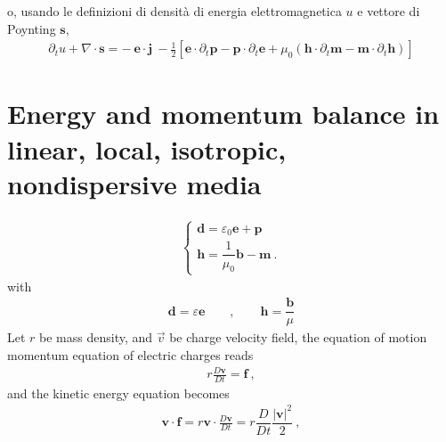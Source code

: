 \documentclass[letterpaper,10pt,italian]{jupyterBook}
\begin{document}
\sphinxAtStartPar
o, usando le definizioni di densità di energia elettromagnetica \(u\) e vettore di Poynting \(\mathbf{s}\),
\begin{equation*}
\begin{split}
  \partial_t u + \nabla \cdot \mathbf{s} =
    - \ \mathbf{e} \cdot \mathbf{j} \
    - \frac{1}{2} \left[ \mathbf{e} \cdot \partial_t \mathbf{p} - \mathbf{p} \cdot \partial_t \mathbf{e} + \mu_0 \left(  \mathbf{h} \cdot \partial_t \mathbf{m} - \mathbf{m} \cdot \partial_t \mathbf{h} \right) \right]
\end{split}
\end{equation*}
\sphinxstepscope


\chapter{Energy and momentum balance in linear, local, isotropic, non\sphinxhyphen{}dispersive media}
\label{\detokenize{ch/energy-linear:energy-and-momentum-balance-in-linear-local-isotropic-non-dispersive-media}}\label{\detokenize{ch/energy-linear:classical-electromagnetism-energy}}\label{\detokenize{ch/energy-linear::doc}}\begin{equation*}
\begin{split}\begin{cases}
  \mathbf{d} = \varepsilon_0 \mathbf{e} + \mathbf{p} \\
  \mathbf{h} = \dfrac{1}{\mu_0} \mathbf{b} - \mathbf{m} \ .
\end{cases}\end{split}
\end{equation*}
\sphinxAtStartPar
with
\begin{equation*}
\begin{split}\mathbf{d} = \varepsilon \mathbf{e} \qquad , \qquad \mathbf{h} = \dfrac{\mathbf{b}}{\mu}\end{split}
\end{equation*}
\sphinxAtStartPar
Let \(r\) be mass density, and \(\vec{v}\) be charge velocity field, the equation of motion \sphinxhyphen{} momentum equation \sphinxhyphen{} of electric charges reads
\begin{equation*}
\begin{split}r \frac{D \mathbf{v}}{D t} = \mathbf{f} \ ,\end{split}
\end{equation*}
\sphinxAtStartPar
and the kinetic energy equation becomes
\begin{equation*}
\begin{split}\mathbf{v} \cdot \mathbf{f} = r \mathbf{v} \cdot \frac{D \mathbf{v}}{D t} = r \dfrac{D}{Dt} \dfrac{|\mathbf{v}|^2}{2} \ ,\end{split}
\end{equation*}
\end{document}
